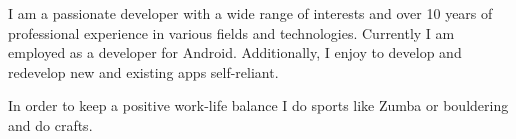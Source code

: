 

\begin{cvparagraph}

I am a passionate developer with a wide range of interests and over 10 years of professional experience in various fields and 
technologies. Currently I am employed as a developer for Android. Additionally, I enjoy to develop and redevelop new and existing apps self-reliant. 

In order to keep a positive work-life balance I do sports like Zumba or bouldering and do crafts.
\end{cvparagraph}
